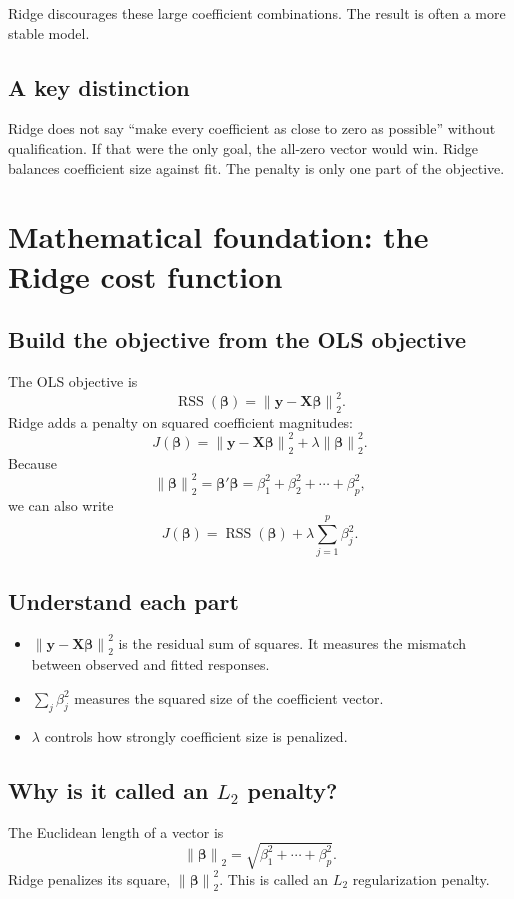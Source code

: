 \documentclass[11pt,a4paper,oneside]{book}
\theoremstyle{remark}
\newcommand{\X}{\mathbf X}
\newcommand{\y}{\mathbf y}
\newcommand{\bta}{\boldsymbol{\beta}}
\newcommand{\RSS}{\operatorname{RSS}}
\newcommand{\norm}[1]{\left\lVert #1\right\rVert_2}
\begin{document}
Ridge discourages these large coefficient combinations. The result is often
a more stable model.

\section{A key distinction}
Ridge does not say ``make every coefficient as close to zero as possible''
without qualification. If that were the only goal, the all-zero vector would
win. Ridge balances coefficient size against fit. The penalty is only one
part of the objective.

\chapter{Mathematical foundation: the Ridge cost function}

\section{Build the objective from the OLS objective}
The OLS objective is
\[
\RSS(\bta)=\norm{\y-\X\bta}^2.
\]
Ridge adds a penalty on squared coefficient magnitudes:
\[
\boxed{
J(\bta)=\norm{\y-\X\bta}^2+\lambda\norm{\bta}^2.
}
\]
Because
\[
\norm{\bta}^2=\bta'\bta
=\beta_1^2+\beta_2^2+\cdots+\beta_p^2,
\]
we can also write
\[
\boxed{
J(\bta)=\RSS(\bta)+
\lambda\sum_{j=1}^{p}\beta_j^2.
}
\]

\section{Understand each part}
\begin{itemize}
\item $\norm{\y-\X\bta}^2$ is the residual sum of squares. It measures
the mismatch between observed and fitted responses.
\item $\sum_j\beta_j^2$ measures the squared size of the coefficient vector.
\item $\lambda$ controls how strongly coefficient size is penalized.
\end{itemize}

\section{Why is it called an \texorpdfstring{$L_2$}{L2} penalty?}
The Euclidean length of a vector is
\[
\norm{\bta}=\sqrt{\beta_1^2+\cdots+\beta_p^2}.
\]
Ridge penalizes its square, $\norm{\bta}^2$. This is called an $L_2$
regularization penalty.
\end{document}
